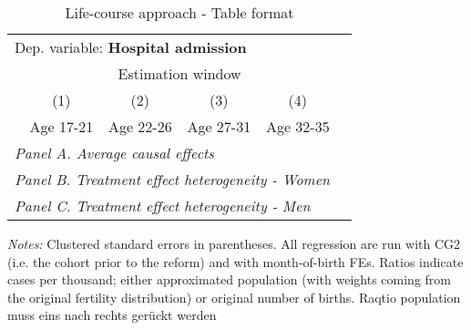  \begin{table}[H] \centering \begin{threeparttable} \caption{Life-course approach - Table format} {\def\sym#1{\ifmmode^{#1}\else\(^{#1}\)\fi} \begin{tabular}{l*{5}{c}} \toprule \multicolumn{5}{l}{Dep. variable: \textbf{Hospital admission}} \\ & \multicolumn{4}{c}{Estimation window} \\ \cmidrule(lr){2-5}
            &\multicolumn{1}{c}{(1)}&\multicolumn{1}{c}{(2)}&\multicolumn{1}{c}{(3)}&\multicolumn{1}{c}{(4)}\\
            &\multicolumn{1}{c}{Age 17-21}&\multicolumn{1}{c}{Age 22-26}&\multicolumn{1}{c}{Age 27-31}&\multicolumn{1}{c}{Age 32-35}\\
\midrule
 \multicolumn{5}{l}{\emph{Panel A. Average causal effects}} \\      \midrule\multicolumn{5}{l}{\emph{Panel B. Treatment effect heterogeneity - Women}} \\      \midrule\multicolumn{5}{l}{\emph{Panel C. Treatment effect heterogeneity - Men}} \\      
\bottomrule \end{tabular} } \begin{tablenotes} \item \scriptsize \emph{Notes:} Clustered standard errors in parentheses. All regression are run with CG2 (i.e. the cohort prior to the reform) and with month-of-birth FEs. Ratios indicate cases per thousand; either approximated population (with weights coming from the original fertility distribution) or original number of births. Raqtio population muss eins nach rechts gerückt werden \end{tablenotes} \end{threeparttable} \end{table} 

